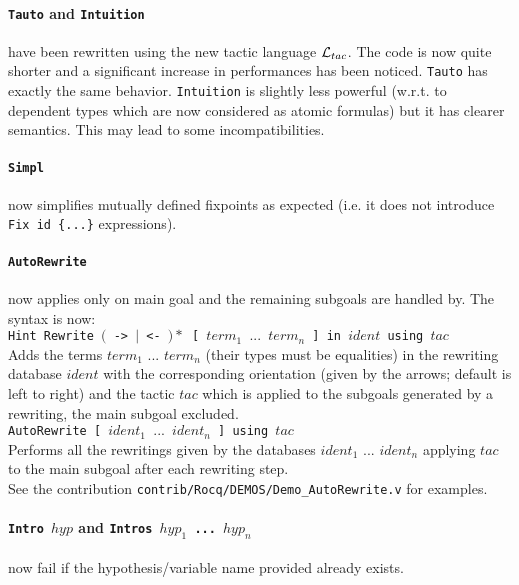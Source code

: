 \documentclass[11pt]{article}
\begin{document}
   \paragraph{{\tt Tauto} and {\tt Intuition}} have been rewritten using the
   new tactic language ${\cal L}_{tac}$. The code is now quite shorter and a significant
   increase in performances has been noticed. {\tt Tauto} has exactly the same
   behavior. {\tt Intuition} is slightly less powerful (w.r.t. to dependent
   types which are now considered as atomic formulas) but it has clearer
   semantics. This may lead to some incompatibilities.

  \paragraph{{\tt Simpl}} now simplifies mutually defined fixpoints
  as expected (i.e. it does not introduce {\tt Fix id
  \{...\}} expressions).

  \paragraph{{\tt AutoRewrite}} now applies only on main goal and the remaining
  subgoals are handled by. The syntax is now:\\

  {\tt Hint Rewrite $($ -> $|$ <- $)*$ [ $term_1$ $...$ $term_n$ ] in
    $ident$ using $tac$}\\

  Adds the terms $term_1$ $...$ $term_n$ (their types must be equalities) in
  the rewriting database $ident$ with the corresponding orientation (given by
  the arrows; default is left to right) and the tactic $tac$ which is applied
  to the subgoals generated by a rewriting, the main subgoal excluded.\\

  {\tt AutoRewrite  [ $ident_1$ $...$ $ident_n$ ] using $tac$}\\

  Performs all the rewritings given by the databases $ident_1$ $...$ $ident_n$
  applying $tac$ to the main subgoal after each rewriting step.\\

  See the contribution \texttt{contrib/Rocq/DEMOS/Demo\_AutoRewrite.v} for
  examples.

  \paragraph{{\tt Intro $hyp$} and {\bf \tt Intros $hyp_1$ ... $hyp_n$}}
  now fail if the hypothesis/variable name provided already exists.
\end{document}
